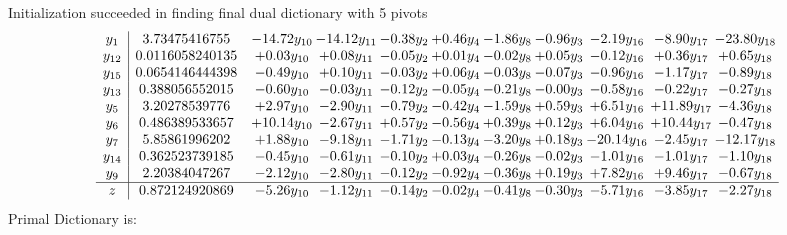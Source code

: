\documentclass[9pt]{article}
\begin{document}
Initialization succeeded in finding final dual dictionary with 5 pivots
\[\begin{array}{c| c c@{\hskip 2pt} c@{\hskip 2pt} c@{\hskip 2pt} c@{\hskip 2pt} c@{\hskip 2pt} c@{\hskip 2pt} c@{\hskip 2pt} c@{\hskip 2pt} c@{\hskip 2pt} }
 y_{1}   &  3.73475416755 & -14.72 y_{10} & -14.12 y_{11} & -0.38 y_{2} & +  0.46 y_{4} & -1.86 y_{8} & -0.96 y_{3} & -2.19 y_{16} & -8.90 y_{17} & -23.80 y_{18}\\
 y_{12}   &  0.0116058240135 & +  0.03 y_{10} & +  0.08 y_{11} & -0.05 y_{2} & +  0.01 y_{4} & -0.02 y_{8} & +  0.05 y_{3} & -0.12 y_{16} & +  0.36 y_{17} & +  0.65 y_{18}\\
 y_{15}   &  0.0654146444398 & -0.49 y_{10} & +  0.10 y_{11} & -0.03 y_{2} & +  0.06 y_{4} & -0.03 y_{8} & -0.07 y_{3} & -0.96 y_{16} & -1.17 y_{17} & -0.89 y_{18}\\
 y_{13}   &  0.388056552015 & -0.60 y_{10} & -0.03 y_{11} & -0.12 y_{2} & -0.05 y_{4} & -0.21 y_{8} & -0.00 y_{3} & -0.58 y_{16} & -0.22 y_{17} & -0.27 y_{18}\\
 y_{5}   &  3.20278539776 & +  2.97 y_{10} & -2.90 y_{11} & -0.79 y_{2} & -0.42 y_{4} & -1.59 y_{8} & +  0.59 y_{3} & +  6.51 y_{16} & + 11.89 y_{17} & -4.36 y_{18}\\
 y_{6}   &  0.486389533657 & + 10.14 y_{10} & -2.67 y_{11} & +  0.57 y_{2} & -0.56 y_{4} & +  0.39 y_{8} & +  0.12 y_{3} & +  6.04 y_{16} & + 10.44 y_{17} & -0.47 y_{18}\\
 y_{7}   &  5.85861996202 & +  1.88 y_{10} & -9.18 y_{11} & -1.71 y_{2} & -0.13 y_{4} & -3.20 y_{8} & +  0.18 y_{3} & -20.14 y_{16} & -2.45 y_{17} & -12.17 y_{18}\\
 y_{14}   &  0.362523739185 & -0.45 y_{10} & -0.61 y_{11} & -0.10 y_{2} & +  0.03 y_{4} & -0.26 y_{8} & -0.02 y_{3} & -1.01 y_{16} & -1.01 y_{17} & -1.10 y_{18}\\
 y_{9}   &  2.20384047267 & -2.12 y_{10} & -2.80 y_{11} & -0.12 y_{2} & -0.92 y_{4} & -0.36 y_{8} & +  0.19 y_{3} & +  7.82 y_{16} & +  9.46 y_{17} & -0.67 y_{18}\\
\hline
z    &  0.872124920869 & -5.26 y_{10} & -1.12 y_{11} & -0.14 y_{2} & -0.02 y_{4} & -0.41 y_{8} & -0.30 y_{3} & -5.71 y_{16} & -3.85 y_{17} & -2.27 y_{18}\\
\end{array}\]
Primal Dictionary is:
\end{document}

